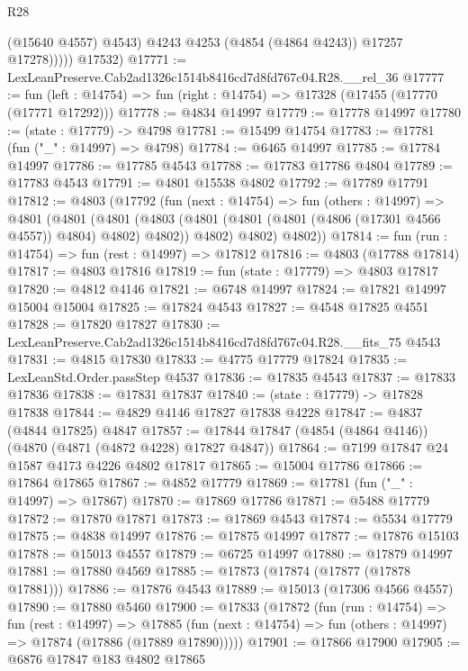 \begin{lexlean}{R28}
\begin{coremodule}
                  (@15640 @4557)
                  @4543)
                @4243
                @4253
                (@4854 (@4864 @4243))
                @17257
                @17278)))))
      @17532)
@17771 := LexLeanPreserve.Cab2ad1326c1514b8416cd7d8fd767c04.R28.__rel_36
@17777 := fun (left : @14754) => fun (right : @14754) => @17328 (@17455 (@17770 (@17771 @17292)))
@17778 := @4834 @14997
@17779 := @17778 @14997
@17780 := (state : @17779) -> @4798
@17781 := @15499 @14754
@17783 := @17781 (fun ("_" : @14997) => @4798)
@17784 := @6465 @14997
@17785 := @17784 @14997
@17786 := @17785 @4543
@17788 := @17783 @17786 @4804
@17789 := @17783 @4543
@17791 := @4801 @15538 @4802
@17792 := @17789 @17791
@17812 := @4803
    (@17792
      (fun (next : @14754) =>
      fun (others : @14997) =>
      @4801
        (@4801
          (@4801
            (@4803 (@4801 (@4801 (@4801 (@4806 (@17301 @4566 @4557)) @4804) @4802) @4802))
            @4802)
          @4802)
        @4802))
@17814 := fun (run : @14754) => fun (rest : @14997) => @17812
@17816 := @4803 (@17788 @17814)
@17817 := @4803 @17816
@17819 := fun (state : @17779) => @4803 @17817
@17820 := @4812 @4146
@17821 := @6748 @14997
@17824 := @17821 @14997 @15004 @15004
@17825 := @17824 @4543
@17827 := @4548 @17825 @4551
@17828 := @17820 @17827
@17830 := LexLeanPreserve.Cab2ad1326c1514b8416cd7d8fd767c04.R28.__fits_75 @4543
@17831 := @4815 @17830
@17833 := @4775 @17779 @17824
@17835 := LexLeanStd.Order.passStep @4537
@17836 := @17835 @4543
@17837 := @17833 @17836
@17838 := @17831 @17837
@17840 := (state : @17779) -> @17828 @17838
@17844 := @4829 @4146 @17827 @17838 @4228
@17847 := @4837 (@4844 @17825) @4847
@17857 := @17844 @17847 (@4854 (@4864 @4146)) (@4870 (@4871 (@4872 @4228) @17827 @4847))
@17864 := @7199 @17847 @24 @1587 @4173 @4226 @4802 @17817
@17865 := @15004 @17786
@17866 := @17864 @17865
@17867 := @4852 @17779
@17869 := @17781 (fun ("_" : @14997) => @17867)
@17870 := @17869 @17786
@17871 := @5488 @17779
@17872 := @17870 @17871
@17873 := @17869 @4543
@17874 := @5534 @17779
@17875 := @4838 @14997
@17876 := @17875 @14997
@17877 := @17876 @15103
@17878 := @15013 @4557
@17879 := @6725 @14997
@17880 := @17879 @14997
@17881 := @17880 @4569
@17885 := @17873 (@17874 (@17877 (@17878 @17881)))
@17886 := @17876 @4543
@17889 := @15013 (@17306 @4566 @4557)
@17890 := @17880 @5460
@17900 := @17833
    (@17872
      (fun (run : @14754) =>
      fun (rest : @14997) =>
      @17885 (fun (next : @14754) => fun (others : @14997) => @17874 (@17886 (@17889 @17890)))))
@17901 := @17866 @17900
@17905 := @6876 @17847 @183 @4802 @17865

\end{coremodule}
\end{lexlean}
